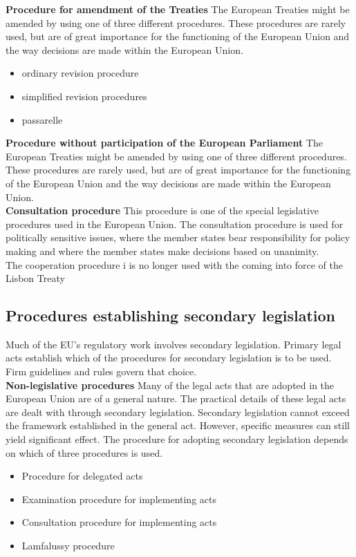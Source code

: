 \clearpage
\textbf{Procedure for amendment of the Treaties}
The European Treaties might be amended by using one of three different procedures. These procedures are rarely used, but are of great importance for the functioning of the European Union and the way decisions are made within the European Union.
\begin{itemize}
	\item ordinary revision procedure 
	\item simplified revision procedures 
	\item passarelle 
\end{itemize}

\textbf{Procedure without participation of the European Parliament}
The European Treaties might be amended by using one of three different procedures. These procedures are rarely used, but are of great importance for the functioning of the European Union and the way decisions are made within the European Union. \\

\textbf{Consultation procedure}
This procedure is one of the special legislative procedures used in the European Union. The consultation procedure is used for politically sensitive issues, where the member states bear responsibility for policy making and where the member states make decisions based on unanimity. \\

The cooperation procedure i is no longer used with the coming into force of the Lisbon Treaty

\clearpage
\subsection{Procedures establishing secondary legislation}

Much of the EU's regulatory work involves secondary legislation. Primary legal acts establish which of the procedures for secondary legislation is to be used. Firm guidelines and rules govern that choice. \\

\textbf{Non-legislative procedures}
Many of the legal acts that are adopted in the European Union are of a general nature. The practical details of these legal acts are dealt with through secondary legislation. Secondary legislation cannot exceed the framework established in the general act. However, specific measures can still yield significant effect. The procedure for adopting secondary legislation depends on which of three procedures is used.
\begin{itemize}
\item Procedure for delegated acts 
\item Examination procedure for implementing acts  
\item Consultation procedure for implementing acts 
\item Lamfalussy procedure 
\end{itemize}

